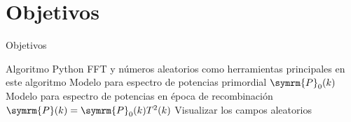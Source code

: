 \section{Objetivos}
\begin{frame}[noframenumbering]{Objetivos}
    \begin{itemize}
        \okitem Algoritmo Python
        \okitem FFT y números aleatorios como herramientas principales en este algoritmo
        \okitem Modelo para espectro de potencias primordial \(\symrm{P}_0(k)\)
        \okitem Modelo para espectro de potencias en época de recombinación \(\symrm{P}(k)=\symrm{P}_0(k)T^2(k)\)
        \okitem Visualizar los campos aleatorios
    \end{itemize}
\end{frame}